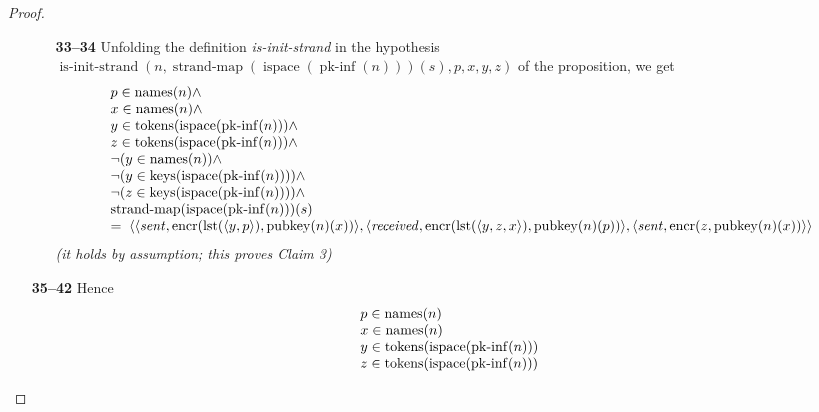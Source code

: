 \documentclass[11pt]{article}
\theoremstyle{plain}
\begin{document}
\begin{proof}
\begin{itemize}[leftmargin=2.8em, itemsep=4pt, parsep=1pt]
  \begin{itemize}[leftmargin=2.8em, itemsep=4pt, parsep=1pt]
  \item[\textbf{33--34}] Unfolding the definition \emph{is-init-strand} in the hypothesis $\operatorname{is\text{-}init\text{-}strand}(n, \operatorname{strand\text{-}map}(\operatorname{ispace}(\operatorname{pk\text{-}inf}(n)))(s), p, x, y, z)$ of the proposition, we get
\begin{equation*}
\begin{array}{@{}l@{}} p \in \operatorname{names}(n) \wedge \\ x \in \operatorname{names}(n) \wedge \\ y \in \operatorname{tokens}(\operatorname{ispace}(\operatorname{pk\text{-}inf}(n))) \wedge \\ z \in \operatorname{tokens}(\operatorname{ispace}(\operatorname{pk\text{-}inf}(n))) \wedge \\ \neg (y \in \operatorname{names}(n)) \wedge \\ \neg (y \in \operatorname{keys}(\operatorname{ispace}(\operatorname{pk\text{-}inf}(n)))) \wedge \\ \neg (z \in \operatorname{keys}(\operatorname{ispace}(\operatorname{pk\text{-}inf}(n)))) \wedge \\ \operatorname{strand\text{-}map}(\operatorname{ispace}(\operatorname{pk\text{-}inf}(n)))(s) \\ =\; \langle \langle \mathit{sent}, \operatorname{encr}(\operatorname{lst}(\langle y, p \rangle), \operatorname{pubkey}(n)(x)) \rangle, \langle \mathit{received}, \operatorname{encr}(\operatorname{lst}(\langle y, z, x \rangle), \operatorname{pubkey}(n)(p)) \rangle, \langle \mathit{sent}, \operatorname{encr}(z, \operatorname{pubkey}(n)(x)) \rangle \rangle \end{array}
\end{equation*}
  \emph{(it holds by assumption; this proves Claim 3)}
  \end{itemize}
  \item[\textbf{35--42}] Hence 
\begin{equation*}
\begin{array}{@{}l@{}}
p \in \operatorname{names}(n) \\
x \in \operatorname{names}(n) \\
y \in \operatorname{tokens}(\operatorname{ispace}(\operatorname{pk\text{-}inf}(n))) \\
z \in \operatorname{tokens}(\operatorname{ispace}(\operatorname{pk\text{-}inf}(n))) \\

\end{array}
\end{equation*}
\end{itemize}
\end{proof}
\end{document}
